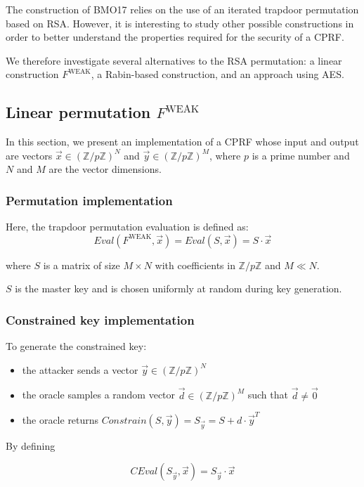 \documentclass[9pt]{extarticle}
\begin{document}
The construction of BMO17 relies on the use of an iterated trapdoor permutation based on RSA. 
However, it is interesting to study other possible constructions in order 
to better understand the properties required for the security of a CPRF.

We therefore investigate several alternatives to the RSA permutation: 
a linear construction \(F^{\text{WEAK}}\), a Rabin-based construction, 
and an approach using AES.

\subsection{Linear permutation $F^{\text{WEAK}}$}

In this section, we present an implementation of a CPRF whose input and output are vectors
$\vec{x} \in (\mathbb{Z}/p\mathbb{Z})^N$ and $\vec{y} \in (\mathbb{Z}/p\mathbb{Z})^M$,
where $p$ is a prime number and $N$ and $M$ are the vector dimensions.

\subsubsection{Permutation implementation}
Here, the trapdoor permutation evaluation is defined as:
\[Eval(F^{\text{WEAK}},\vec{x}) = Eval(S,\vec{x}) = S \cdot \vec{x}\]

where $S$ is a matrix of size $M \times N$ with coefficients in $\mathbb{Z}/p\mathbb{Z}$
and $M \ll N$.

$S$ is the master key and is chosen uniformly at random during key generation.

\subsubsection{Constrained key implementation}

To generate the constrained key:
\begin{itemize}
  \item the attacker sends a vector $\vec{y} \in (\mathbb{Z}/p\mathbb{Z})^N$
  \item the oracle samples a random vector $\vec{d} \in (\mathbb{Z}/p\mathbb{Z})^M$ such that $\vec{d} \neq \vec{0}$
  \item the oracle returns $Constrain(S, \vec{y}) = S_{\vec{y}} = S + d \cdot \vec{y}^T$
\end{itemize}

By defining

\[CEval(S_{\vec{y}}, \vec{x}) =  S_{\vec{y}} \cdot \vec{x}\]
\end{document}
